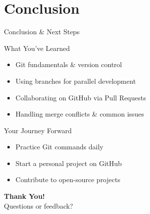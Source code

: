 \documentclass[aspectratio=169]{beamer}
\begin{document}
\section{Conclusion}

\begin{frame}{Conclusion \& Next Steps}
    \begin{block}{What You've Learned}
        \begin{itemize}
            \item Git fundamentals \& version control
            \item Using branches for parallel development
            \item Collaborating on GitHub via Pull Requests
            \item Handling merge conflicts \& common issues
        \end{itemize}
    \end{block}

    \begin{exampleblock}{Your Journey Forward}
        \begin{itemize}
            \item Practice Git commands daily
            \item Start a personal project on GitHub
            \item Contribute to open-source projects
        \end{itemize}
    \end{exampleblock}
\end{frame}

\begin{frame}
  \centering
  \Huge{\textbf{Thank You!}}\\[1em]
  \large{Questions or feedback?}
\end{frame}
\end{document}
